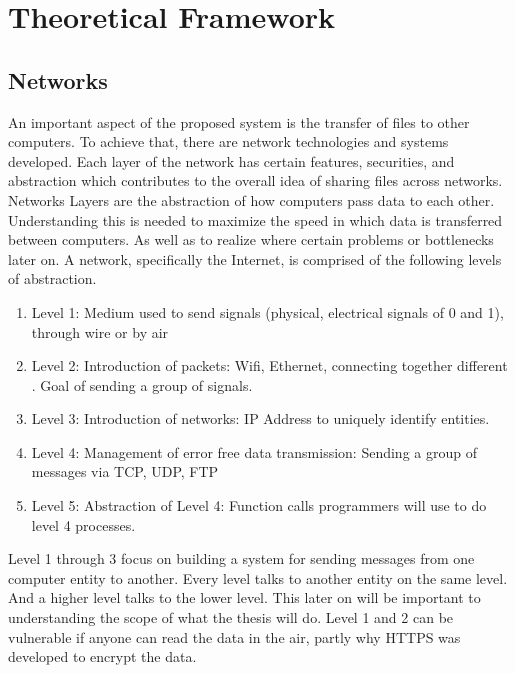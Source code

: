 \documentclass[acmsmall]{acmart}
\begin{document}



\section{Theoretical Framework}

\subsection{Networks}

An important aspect of the proposed system is the transfer of files to other computers. To achieve that, there are network technologies and systems developed. Each layer of the network has certain features, securities, and abstraction which contributes to the overall idea of sharing files across networks. Networks Layers are the abstraction of how computers pass data to each other. Understanding this is needed to maximize the speed in which data is transferred between computers. As well as to realize where certain problems or bottlenecks later on. A network, specifically the Internet, is comprised of the following levels of abstraction. \cite{kurose}
\begin{enumerate}
    \item Level 1: Medium used to send signals (physical, electrical signals of 0
and 1), through wire or by air
    \item Level 2: Introduction of packets: Wifi, Ethernet, connecting together
different . Goal of sending a group of signals.
    \item Level 3: Introduction of networks: IP Address to uniquely identify
entities.
    \item Level 4: Management of error free data transmission: Sending a group
of messages via TCP, UDP, FTP
    \item Level 5: Abstraction of Level 4: Function calls programmers will use
to do level 4 processes.
\end{enumerate}

Level 1 through 3 focus on building a system for sending messages from one computer entity to another. Every level talks to another entity on the same level. And a higher level talks to the lower level. This later on will be important to understanding the scope of what the thesis will do. Level 1 and 2 can be vulnerable if anyone can read the data in the air, partly why HTTPS was developed to encrypt the data. 
\end{document}
